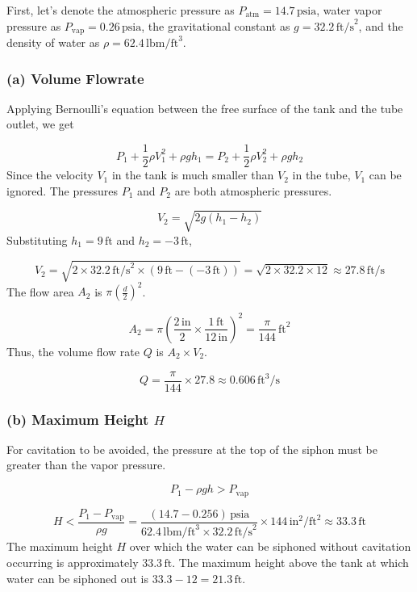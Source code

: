\documentclass{article}
\begin{document}
First, let's denote the atmospheric pressure as \(P_{\text{atm}} = 14.7 \, \text{psia}\), water vapor pressure as \(P_{\text{vap}} = 0.26 \, \text{psia}\), the gravitational constant as \(g = 32.2 \, \text{ft/s}^2\), and the density of water as \(\rho = 62.4 \, \text{lbm/ft}^3\).

\subsubsection*{(a) Volume Flowrate}

Applying Bernoulli's equation between the free surface of the tank and the tube outlet, we get

\[
P_1 + \frac{1}{2} \rho V_1^2 + \rho g h_1 = P_2 + \frac{1}{2} \rho V_2^2 + \rho g h_2
\]
Since the velocity \(V_1\) in the tank is much smaller than \(V_2\) in the tube, \(V_1\) can be ignored. The pressures \(P_1\) and \(P_2\) are both atmospheric pressures.

\[
V_2 = \sqrt{2g(h_1 - h_2)}
\]
Substituting \(h_1 = 9 \, \text{ft}\) and \(h_2 = -3 \, \text{ft}\),

\[
V_2 = \sqrt{2 \times 32.2 \, \text{ft/s}^2 \times (9 \, \text{ft} - (-3 \, \text{ft}))} = \sqrt{2 \times 32.2 \times 12} \approx 27.8 \, \text{ft/s}
\]
The flow area \(A_2\) is \( \pi \left(\frac{d}{2}\right)^2 \).

\[
A_2 = \pi \left( \frac{2 \, \text{in}}{2} \times \frac{1 \, \text{ft}}{12 \, \text{in}} \right)^2 = \frac{\pi}{144} \, \text{ft}^2
\]
Thus, the volume flow rate \(Q\) is \( A_2 \times V_2 \).

\[
Q = \frac{\pi}{144} \times 27.8 \approx 0.606 \, \text{ft}^3/\text{s}
\]

\subsubsection*{(b) Maximum Height \(H\)}

For cavitation to be avoided, the pressure at the top of the siphon must be greater than the vapor pressure.

\[
P_1 - \rho g h > P_{\text{vap}}
\]

\[
H < \frac{P_1 - P_{\text{vap}}}{\rho g} = \frac{(14.7 - 0.256) \, \text{psia}}{62.4 \, \text{lbm/ft}^3 \times 32.2 \, \text{ft/s}^2} \times 144 \, \text{in}^2/\text{ft}^2 \approx 33.3 \, \text{ft}
\]
The maximum height \(H\) over which the water can be siphoned without cavitation occurring is approximately \(33.3 \, \text{ft}\). 
\newline
The maximum height above the tank at which water can be siphoned out is \( 33.3 - 12 = 21.3 \, \text{ft}\).
\end{document}
